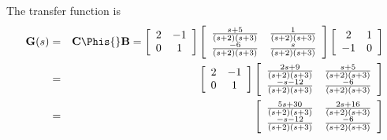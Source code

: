 \begin{slide}\label{slide:l4s13}
 The transfer
function is \begin{eqnarray*}
\mathbf{G}(s)&=&\mathbf{C}\Phis{}\mathbf{B} =
\left[\begin{array}{cc}
  2 & -1 \\
  0 & 1
\end{array}\right]
\left[\begin{array}{cc}
  \frac{s+5}{(s+2)(s+3)} & \frac{1}{(s+2)(s+3)} \\
  \frac{-6}{(s+2)(s+3)} & \frac{s}{(s+2)(s+3)}
\end{array}\right]\left[\begin{array}{cc}
  2 & 1 \\
 -1 & 0
\end{array}\right]\\
&=&\left[\begin{array}{cc}
  2 & -1 \\
  0 & 1
\end{array}\right]
\left[\begin{array}{cc}
  \frac{2s+9}{(s+2)(s+3)} & \frac{s+5}{(s+2)(s+3)} \\
  \frac{-s-12}{(s+2)(s+3)} & \frac{-6}{(s+2)(s+3)}
\end{array}\right]\\
&=& \left[\begin{array}{cc}
  \frac{5s+30}{(s+2)(s+3)} & \frac{2s+16}{(s+2)(s+3)} \\
   \frac{-s-12}{(s+2)(s+3)} & \frac{-6}{(s+2)(s+3)}
\end{array}\right]
\end{eqnarray*}
\end{slide}
